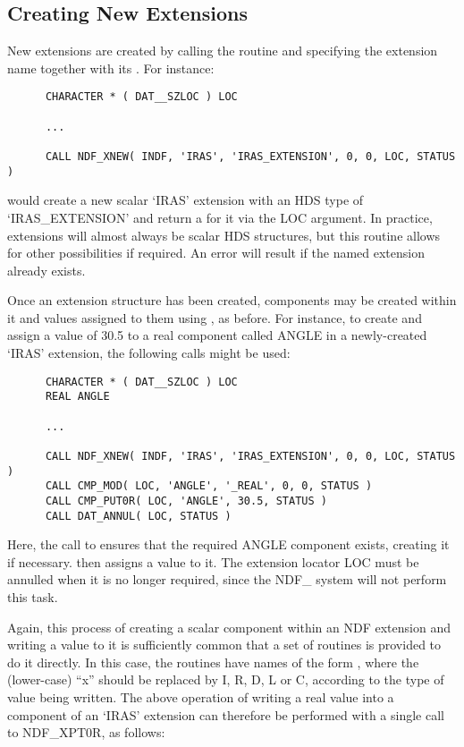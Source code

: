\subsection{\label{ss:creatingnewextensions}Creating New Extensions}

New extensions are created by calling the routine  and specifying
the extension name together with its .
For instance:

\small
\begin{verbatim}
      CHARACTER * ( DAT__SZLOC ) LOC

      ...

      CALL NDF_XNEW( INDF, 'IRAS', 'IRAS_EXTENSION', 0, 0, LOC, STATUS )
\end{verbatim}
\normalsize

would create a new scalar `IRAS' extension with an HDS type of
`IRAS\_EXTENSION' and return a 
for it via the LOC argument.
In practice, extensions will almost always be scalar HDS structures, but
this routine allows for other possibilities if required. 
An error will result if the named extension already exists. 

Once an extension structure has been created, components may be created
within it and values assigned to them using , as before.
For instance, to create and assign a value of 30.5 to a real component
called ANGLE in a newly-created `IRAS' extension, the following calls might
be used: 

\small
\begin{verbatim}
      CHARACTER * ( DAT__SZLOC ) LOC
      REAL ANGLE

      ...

      CALL NDF_XNEW( INDF, 'IRAS', 'IRAS_EXTENSION', 0, 0, LOC, STATUS )
      CALL CMP_MOD( LOC, 'ANGLE', '_REAL', 0, 0, STATUS )
      CALL CMP_PUT0R( LOC, 'ANGLE', 30.5, STATUS )
      CALL DAT_ANNUL( LOC, STATUS )
\end{verbatim}
\normalsize

Here, the call to  ensures that the
required ANGLE component exists, creating it if necessary.
 then assigns a value to it. 
The extension locator LOC must be annulled when it is no longer required,
since the NDF\_ system will not perform this task. 

Again, this process of creating a scalar component within an NDF extension
and writing a value to it is sufficiently common that a set of routines is
provided to do it directly. 
In this case, the routines have names of the form , where the
(lower-case) ``x'' should be replaced by I, R, D, L or C, according to the
type of value being written. 
The above operation of writing a real value into a component of an `IRAS'
extension can therefore be performed with a single call to NDF\_XPT0R, as
follows: 

